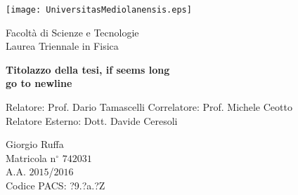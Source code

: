 {
\thispagestyle{empty}

\centerline{
\texttt{[image: UniversitasMediolanensis.eps]}
}

\begin{center}
{\Large Facolt\`a di Scienze e Tecnologie\\
\vskip0.2cm Laurea Triennale in Fisica }
\end{center}


\vskip1.5cm
\begin{center}
{\huge \textbf{Titolazzo della tesi, if seems long\\go to newline}}
\end{center}

{\large
\vskip20mm Relatore:  Prof. Dario Tamascelli
\vskip 1mm Correlatore: Prof. Michele Ceotto\\
\vskip 1mm Relatore Esterno: Dott. Davide Ceresoli\\
}

\vskip2cm
\hskip9cm\parbox[t]{7cm}
{\large 
Giorgio Ruffa\\
Matricola n$^\circ$ $742031$\\
A.A. $2015$/$2016$\\
\vskip 0.5mm Codice PACS: ?9.?a.?Z
}

\newpage
\newpage
\thispagestyle{empty}
\clearpage
}

